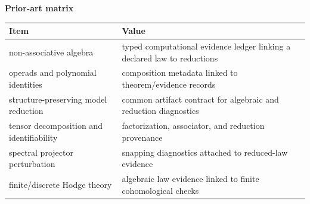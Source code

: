 \begin{center}
\textbf{Prior-art matrix}\par\smallskip
\begin{tabular}{ll}
\toprule
Item & Value \\
\midrule
non-associative algebra & typed computational evidence ledger linking a declared law to reductions \\
operads and polynomial identities & composition metadata linked to theorem/evidence records \\
structure-preserving model reduction & common artifact contract for algebraic and reduction diagnostics \\
tensor decomposition and identifiability & factorization, associator, and reduction provenance \\
spectral projector perturbation & snapping diagnostics attached to reduced-law evidence \\
finite/discrete Hodge theory & algebraic law evidence linked to finite cohomological checks \\
\bottomrule
\end{tabular}
\end{center}
